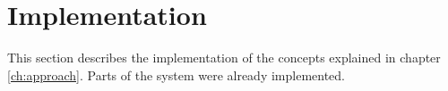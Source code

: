 \chapter{Implementation}
\label{ch:implementation}



This section describes the implementation of the concepts explained in chapter \ref{ch:approach}.
Parts of the system were already implemented.






	